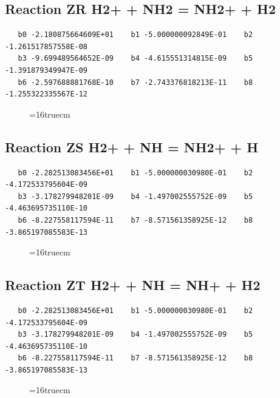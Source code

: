 \documentclass[12pt,dvipdfm]{article}
\begin{document}
\subsection{
Reaction ZR H2+ + NH2 = NH2+ + H2}
\begin{small}\begin{verbatim}
   b0 -2.180875664609E+01    b1 -5.000000092849E-01    b2 -1.261517857558E-08
   b3 -9.699489564652E-09    b4 -4.615551314815E-09    b5 -1.391879349947E-09
   b6 -2.597688881768E-10    b7 -2.743376818213E-11    b8 -1.255322335567E-12
   \end{verbatim}\end{small}
\begin{figure}[h!]
\label{n2rates}
\epsfxsize=16truecm
\end{figure}
\newpage

\subsection{
Reaction ZS H2+ + NH = NH2+ + H}
\begin{small}\begin{verbatim}
   b0 -2.282513083456E+01    b1 -5.000000030980E-01    b2 -4.172533795604E-09
   b3 -3.178279948201E-09    b4 -1.497002555752E-09    b5 -4.463695735110E-10
   b6 -8.227558117594E-11    b7 -8.571561358925E-12    b8 -3.865197085583E-13
   \end{verbatim}\end{small}
\begin{figure}[h!]
\label{n2rates}
\epsfxsize=16truecm
\end{figure}
\newpage

\subsection{
Reaction ZT H2+ + NH = NH+ + H2}
\begin{small}\begin{verbatim}
   b0 -2.282513083456E+01    b1 -5.000000030980E-01    b2 -4.172533795604E-09
   b3 -3.178279948201E-09    b4 -1.497002555752E-09    b5 -4.463695735110E-10
   b6 -8.227558117594E-11    b7 -8.571561358925E-12    b8 -3.865197085583E-13
   \end{verbatim}\end{small}
\begin{figure}[h!]
\label{n2rates}
\epsfxsize=16truecm
\end{figure}
\newpage
\end{document}
